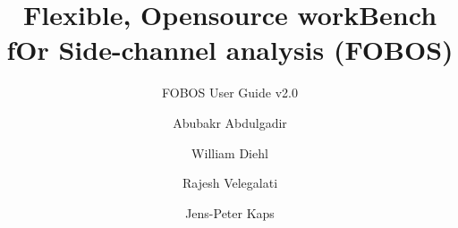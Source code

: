 \documentclass[twoside,11pt]{cergdoc}
\begin{document}
\title{Flexible, Opensource workBench fOr Side-channel analysis (FOBOS)}
\subtitle{FOBOS User Guide v2.0}
\author{Abubakr Abdulgadir \and William Diehl \and Rajesh Velegalati \and Jens-Peter Kaps}
\maketitle
\tableofcontents










\begin{appendix}

\end{appendix}
\end{document}
